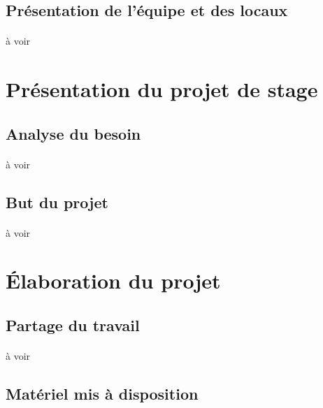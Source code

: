 \documentclass[a4paper,12pt]{extarticle}
\begin{document}
\subsection{Présentation de l'équipe et des locaux}

\paragraph{}
à voir\\

\clearpage

\section{Présentation du projet de stage}

\subsection{Analyse du besoin}

\paragraph{}
à voir\\

\subsection{But du projet}

\paragraph{}
à voir\\

\clearpage

\section{Élaboration du projet}

\subsection{Partage du travail}

\paragraph{}
à voir\\

\subsection{Matériel mis à disposition}
\end{document}
